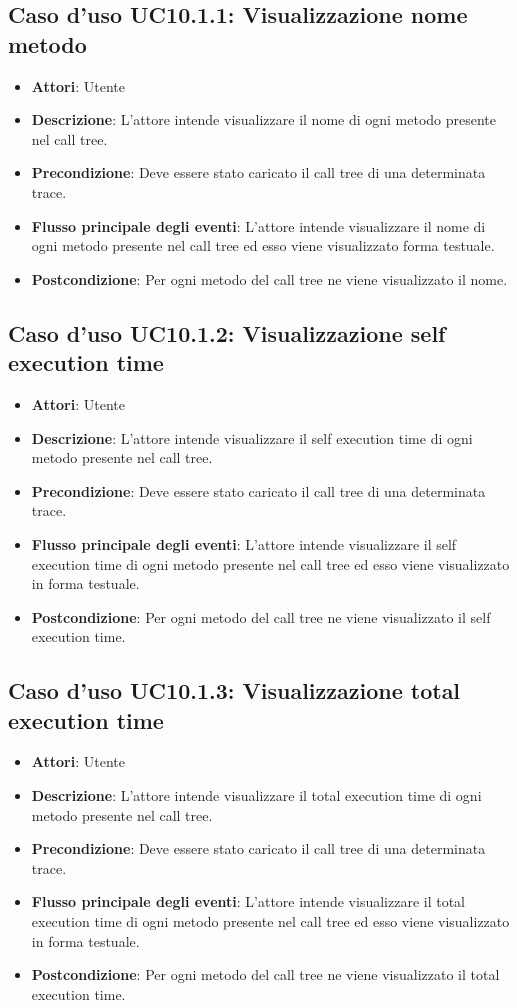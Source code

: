 \subsection{Caso d'uso UC10.1.1: Visualizzazione nome metodo}
\begin{itemize}
	\item \textbf{Attori}: Utente
	\item \textbf{Descrizione}: L'attore intende visualizzare il nome di ogni metodo presente nel call tree.
	\item \textbf{Precondizione}: Deve essere stato caricato il call tree di una determinata trace.
	\item \textbf{Flusso principale degli eventi}: L'attore intende visualizzare il nome di ogni metodo presente nel call tree ed esso viene visualizzato forma testuale.
	\item \textbf{Postcondizione}: Per ogni metodo del call tree ne viene visualizzato il nome.
\end{itemize}
\subsection{Caso d'uso UC10.1.2: Visualizzazione self execution time}
\begin{itemize}
	\item \textbf{Attori}: Utente
	\item \textbf{Descrizione}: L'attore intende visualizzare il self execution time di ogni metodo presente nel call tree.
	\item \textbf{Precondizione}: Deve essere stato caricato il call tree di una determinata trace.
	\item \textbf{Flusso principale degli eventi}: L'attore intende visualizzare il self execution time di ogni metodo presente nel call tree ed esso viene visualizzato in forma testuale.
	\item \textbf{Postcondizione}: Per ogni metodo del call tree ne viene visualizzato il self execution time.
\end{itemize}
\subsection{Caso d'uso UC10.1.3: Visualizzazione total execution time}
\begin{itemize}
	\item \textbf{Attori}: Utente
	\item \textbf{Descrizione}: L'attore intende visualizzare il total execution time di ogni metodo presente nel call tree.
	\item \textbf{Precondizione}: Deve essere stato caricato il call tree di una determinata trace.
	\item \textbf{Flusso principale degli eventi}: L'attore intende visualizzare il total execution time di ogni metodo presente nel call tree ed esso viene visualizzato in forma testuale.
	\item \textbf{Postcondizione}: Per ogni metodo del call tree ne viene visualizzato il total execution time.
\end{itemize}

